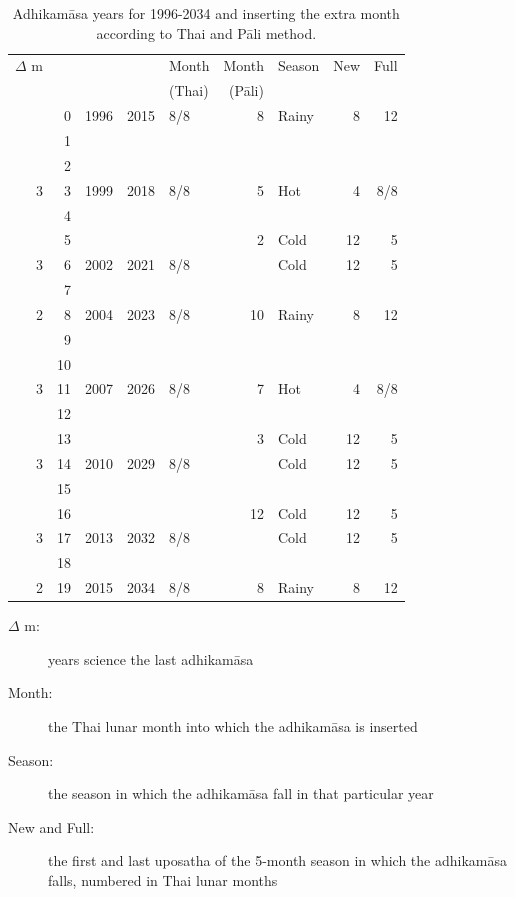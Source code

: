 \documentclass[11pt,oneside]{memoir-article}
\begin{document}
\begin{table}[p]
\caption{\label{tbl-cycle-adhikamasa} Adhikamāsa years for 1996-2034 and inserting the extra month according to Thai and Pāli method.}
\centering
\begin{tabular}{rrrrl|rlrr}
$\Delta$ m &  &  &  & Month & Month & Season & New & Full\\
 &  &  &  & (Thai) & (Pāli) &  &  & \\
\hline
 & 0 & 1996 & 2015 & 8/8 & 8 & Rainy & 8 & 12\\
 & 1 &  &  &  &  &  &  & \\
 & 2 &  &  &  &  &  &  & \\
3 & 3 & 1999 & 2018 & 8/8 & 5 & Hot & 4 & 8/8\\
 & 4 &  &  &  &  &  &  & \\
 & 5 &  &  &  & 2 & Cold & 12 & 5\\
3 & 6 & 2002 & 2021 & 8/8 &  & Cold & 12 & 5\\
 & 7 &  &  &  &  &  &  & \\
2 & 8 & 2004 & 2023 & 8/8 & 10 & Rainy & 8 & 12\\
 & 9 &  &  &  &  &  &  & \\
 & 10 &  &  &  &  &  &  & \\
3 & 11 & 2007 & 2026 & 8/8 & 7 & Hot & 4 & 8/8\\
 & 12 &  &  &  &  &  &  & \\
 & 13 &  &  &  & 3 & Cold & 12 & 5\\
3 & 14 & 2010 & 2029 & 8/8 &  & Cold & 12 & 5\\
 & 15 &  &  &  &  &  &  & \\
 & 16 &  &  &  & 12 & Cold & 12 & 5\\
3 & 17 & 2013 & 2032 & 8/8 &  & Cold & 12 & 5\\
 & 18 &  &  &  &  &  &  & \\
2 & 19 & 2015 & 2034 & 8/8 & 8 & Rainy & 8 & 12\\
\end{tabular}
\end{table}

\begin{description}
\item[{$\Delta$ m:}] years science the last adhikamāsa
\item[{Month:}] the Thai lunar month into which the adhikamāsa is inserted
\item[{Season:}] the season in which the adhikamāsa fall in that
particular year
\item[{New and Full:}] the first and last uposatha of the 5-month season
in which the adhikamāsa falls, numbered in Thai
lunar months
\end{description}
\end{document}
